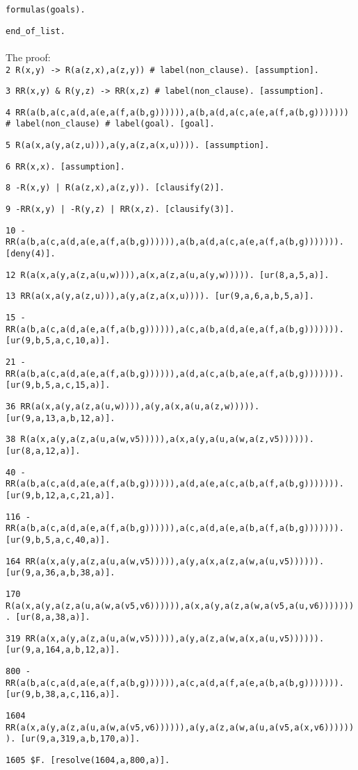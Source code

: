 \documentclass[a4paper]{article}
\begin{document}
	{\tt formulas(goals).}
	
	\indent {}
	
	\indent \indent {}
	
	{\tt end\_of\_list.}\\
	\\
	The proof:\\

	{\tt 2 R(x,y) -> R(a(z,x),a(z,y)) \# label(non\_clause).  [assumption].}
	
	{\tt 3 RR(x,y) \& R(y,z) -> RR(x,z) \# label(non\_clause).  [assumption].}
	
	{\tt 4 RR(a(b,a(c,a(d,a(e,a(f,a(b,g)))))),a(b,a(d,a(c,a(e,a(f,a(b,g))))))) \# label(non\_clause) \# label(goal).  [goal].}
	
	{\tt 5 R(a(x,a(y,a(z,u))),a(y,a(z,a(x,u)))).  [assumption].}
	
	{\tt 6 RR(x,x).  [assumption].}
	
	{\tt 8 -R(x,y) | R(a(z,x),a(z,y)).  [clausify(2)].}
	
	{\tt 9 -RR(x,y) | -R(y,z) | RR(x,z).  [clausify(3)].}
	
	{\tt 10 -RR(a(b,a(c,a(d,a(e,a(f,a(b,g)))))),a(b,a(d,a(c,a(e,a(f,a(b,g))))))).  [deny(4)].}
	
	{\tt 12 R(a(x,a(y,a(z,a(u,w)))),a(x,a(z,a(u,a(y,w))))).  [ur(8,a,5,a)].}
	
	{\tt 13 RR(a(x,a(y,a(z,u))),a(y,a(z,a(x,u)))).  [ur(9,a,6,a,b,5,a)].}
	
	{\tt 15 -RR(a(b,a(c,a(d,a(e,a(f,a(b,g)))))),a(c,a(b,a(d,a(e,a(f,a(b,g))))))).  [ur(9,b,5,a,c,10,a)].}
	
	{\tt 21 -RR(a(b,a(c,a(d,a(e,a(f,a(b,g)))))),a(d,a(c,a(b,a(e,a(f,a(b,g))))))).  [ur(9,b,5,a,c,15,a)].}
	
	{\tt 36 RR(a(x,a(y,a(z,a(u,w)))),a(y,a(x,a(u,a(z,w))))).  [ur(9,a,13,a,b,12,a)].}
	
	{\tt 38 R(a(x,a(y,a(z,a(u,a(w,v5))))),a(x,a(y,a(u,a(w,a(z,v5)))))).  [ur(8,a,12,a)].}
	
	{\tt 40 -RR(a(b,a(c,a(d,a(e,a(f,a(b,g)))))),a(d,a(e,a(c,a(b,a(f,a(b,g))))))).  [ur(9,b,12,a,c,21,a)].}
	
	{\tt 116 -RR(a(b,a(c,a(d,a(e,a(f,a(b,g)))))),a(c,a(d,a(e,a(b,a(f,a(b,g))))))).  [ur(9,b,5,a,c,40,a)].}
	
	{\tt 164 RR(a(x,a(y,a(z,a(u,a(w,v5))))),a(y,a(x,a(z,a(w,a(u,v5)))))).  [ur(9,a,36,a,b,38,a)].}
	
	{\tt 170 R(a(x,a(y,a(z,a(u,a(w,a(v5,v6)))))),a(x,a(y,a(z,a(w,a(v5,a(u,v6))))))).  [ur(8,a,38,a)].}
	
	{\tt 319 RR(a(x,a(y,a(z,a(u,a(w,v5))))),a(y,a(z,a(w,a(x,a(u,v5)))))).  [ur(9,a,164,a,b,12,a)].}
	
	{\tt 800 -RR(a(b,a(c,a(d,a(e,a(f,a(b,g)))))),a(c,a(d,a(f,a(e,a(b,a(b,g))))))).  [ur(9,b,38,a,c,116,a)].}
	
	{\tt 1604 RR(a(x,a(y,a(z,a(u,a(w,a(v5,v6)))))),a(y,a(z,a(w,a(u,a(v5,a(x,v6))))))).  [ur(9,a,319,a,b,170,a)].}
	
	{\tt 1605 \$F.  [resolve(1604,a,800,a)].}
	
	
\end{document}
